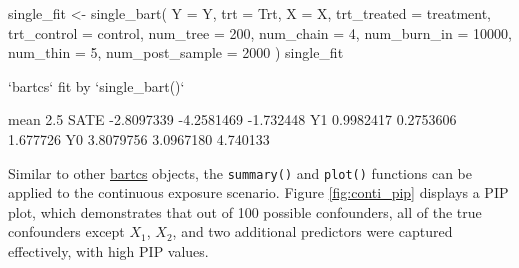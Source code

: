 \begin{example}
single_fit <- single_bart(
    Y = Y, trt = Trt, X = X, 
    trt_treated = treatment, trt_control = control,
    num_tree = 200, num_chain = 4, 
    num_burn_in = 10000, num_thin = 5, num_post_sample = 2000
  )
single_fit

`bartcs` fit by `single_bart()`

           mean       2.5%
SATE -2.8097339 -4.2581469 -1.732448
Y1    0.9982417  0.2753606  1.677726
Y0    3.8079756  3.0967180  4.740133
\end{example}
Similar to other \href{https://CRAN.R-project.org/package=bartcs}{bartcs} objects, the \verb|summary()| and \verb|plot()| functions can be applied to the continuous exposure scenario. Figure \ref{fig:conti_pip} displays a PIP plot, which demonstrates that out of 100 possible confounders, all of the true confounders except $X_1$, $X_2$, and two additional predictors were captured effectively, with high PIP values.

